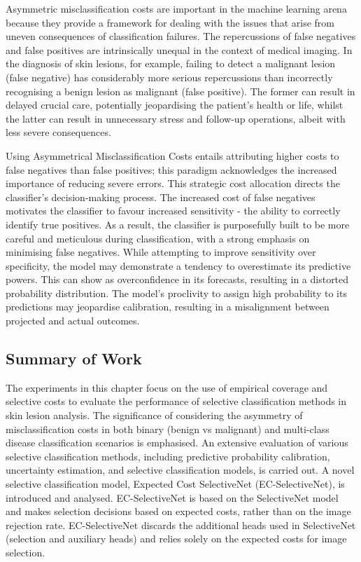 Asymmetric misclassification costs are important in the machine learning arena because they provide a framework for dealing with the issues that arise from uneven consequences of classification failures. The repercussions of false negatives and false positives are intrinsically unequal in the context of medical imaging. In the diagnosis of skin lesions, for example, failing to detect a malignant lesion (false negative) has considerably more serious repercussions than incorrectly recognising a benign lesion as malignant (false positive). The former can result in delayed crucial care, potentially jeopardising the patient's health or life, whilst the latter can result in unnecessary stress and follow-up operations, albeit with less severe consequences.

Using Asymmetrical Misclassification Costs entails attributing higher costs to false negatives than false positives; this paradigm acknowledges the increased importance of reducing severe errors. This strategic cost allocation directs the classifier's decision-making process. The increased cost of false negatives motivates the classifier to favour increased sensitivity - the ability to correctly identify true positives. As a result, the classifier is purposefully built to be more careful and meticulous during classification, with a strong emphasis on minimising false negatives. While attempting to improve sensitivity over specificity, the model may demonstrate a tendency to overestimate its predictive powers. This can show as overconfidence in its forecasts, resulting in a distorted probability distribution. The model's proclivity to assign high probability to its predictions may jeopardise calibration, resulting in a misalignment between projected and actual outcomes.

\subsection{Summary of Work}
\label{subsec:selective_summary_of_work}
The experiments in this chapter focus on the use of empirical coverage and selective costs to evaluate the performance of selective classification methods in skin lesion analysis. The significance of considering the asymmetry of misclassification costs in both binary (benign vs malignant) and multi-class disease classification scenarios is emphasised. An extensive evaluation of various selective classification methods, including predictive probability calibration, uncertainty estimation, and selective classification models, is carried out. A novel selective classification model, Expected Cost SelectiveNet (EC-SelectiveNet), is introduced and analysed. EC-SelectiveNet is based on the SelectiveNet model~\citep{geifman2019selectivenet} and makes selection decisions based on expected costs, rather than on the image rejection rate. EC-SelectiveNet discards the additional heads used in SelectiveNet (selection and auxiliary heads) and relies solely on the expected costs for image selection.

